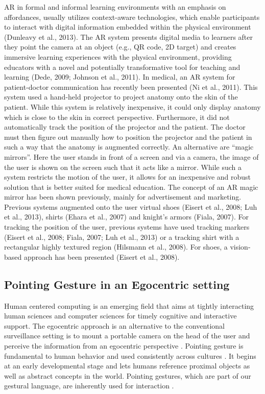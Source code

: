 AR in formal and informal learning environments with an emphasis on affordances, usually utilizes context-aware technologies, which enable participants to interact with digital information embedded within the physical environment (Dunleavy et al., 2013). The AR system presents digital media to learners after they point the camera at an object (e.g., QR code, 2D target) and creates immersive learning experiences with the physical environment, providing educators with a novel and potentially transformative tool for teaching and learning (Dede, 2009; Johnson et al., 2011). In medical, an AR system for patient-doctor communication has recently been presented (Ni et al., 2011). This system used a hand-held projector to project anatomy onto the skin of the patient. While this system is relatively inexpensive, it could only display anatomy which is close to the skin in correct perspective. Furthermore, it did not automatically track the position of the projector and the patient. The doctor must then figure out manually how to position the projector and the patient in such a way that the anatomy is augmented correctly. 
An alternative are “magic mirrors”. Here the user stands in front of a screen and via a camera, the image of the user is shown on the screen such that it acts like a mirror. While such a system restricts the motion of the user, it allows for an inexpensive and robust solution that is better suited for medical education. The concept of an AR magic mirror has been shown previously, mainly for advertisement and marketing. Previous systems augmented onto the user virtual shoes (Eisert et al., 2008; Luh et al., 2013), shirts (Ehara et al., 2007) and knight’s armors (Fiala, 2007). For tracking the position of the user, previous systems have used tracking markers (Eisert et al., 2008; Fiala, 2007; Luh et al., 2013) or a tracking shirt with a rectangular highly textured region (Hilsmann et al., 2008). For shoes, a vision-based approach has been presented (Eisert et al., 2008). 


\subsection{Pointing Gesture in an Egocentric setting}
Human centered computing is an emerging field that aims at tightly interacting human sciences and computer sciences for timely cognitive and interactive support.
The egocentric approach is an alternative to the conventional surveillance setting is to mount a portable camera on the head of the user and perceive the information from an egocentric perspective \citep{Fathi2011,Li2015}. 
Pointing gesture is fundamental to human behavior \citep{Matthews2012} and used consistently across cultures \citep{McNeill2000}. It begins at an early developmental stage \citep{Carpendale2010} and lets humans reference proximal objects as well as abstract concepts in the world. 
Pointing gestures, which are part of our gestural language, are inherently used for interaction \citep{Nanayakkara2013a}. 


